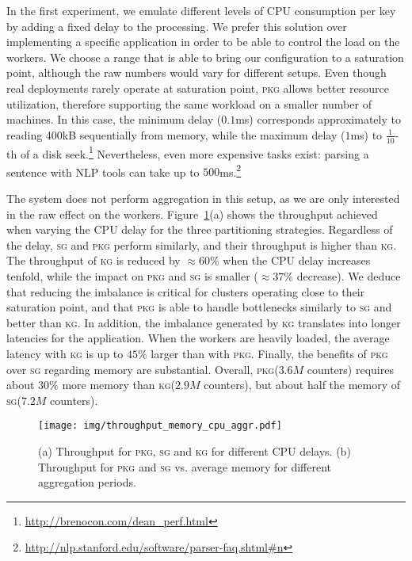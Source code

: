 \documentclass[10pt,conference,letterpaper]{IEEEtran}
\newcommand{\pkgs}{\textsc{pkg}\xspace}
\newcommand{\kg}{\textsc{kg}\xspace}
\newcommand{\sg}{\textsc{sg}\xspace}
\begin{document}
In the first experiment, we emulate different levels of CPU consumption per key by adding a fixed delay to the processing.
We prefer this solution over implementing a specific application in order to be able to control the load on the workers.
We choose a range that is able to bring our configuration to a saturation point, although the raw numbers would vary for different setups.
Even though real deployments rarely operate at saturation point, \pkgs allows better resource utilization, therefore supporting the same workload on a smaller number of machines.
In this case, the minimum delay ($0.1$ms) corresponds approximately to reading 400kB sequentially from memory, while the maximum delay ($1$ms) to $\frac{1}{10}$-th of a disk seek.\footnote{\url{http://brenocon.com/dean_perf.html}}
Nevertheless, even more expensive tasks exist: parsing a sentence with NLP tools can take up to $500$ms.\footnote{\url{http://nlp.stanford.edu/software/parser-faq.shtml\#n}}

The system does not perform aggregation in this setup, as we are only interested in the raw effect on the workers.
Figure~\ref{fig:throughput_memory_cpu_aggr}(a) shows the throughput achieved when varying the CPU delay for the three partitioning strategies.
Regardless of the delay, \sg and \pkgs perform similarly, and their throughput is higher than \kg.
The throughput of \kg is reduced by $\approx 60\%$ when the CPU delay increases tenfold, while the impact on \pkgs and \sg is smaller ($\approx 37\%$ decrease).
We deduce that reducing the imbalance is critical for clusters operating close to their saturation point, and that \pkgs is able to handle bottlenecks similarly to \sg and better than \kg.
In addition, the imbalance generated by \kg translates into longer latencies for the application.
When the workers are heavily loaded, the average latency with \kg is up to $45\%$ larger than with \pkgs. Finally, the benefits of \pkgs over \sg regarding memory are substantial.
Overall, \pkgs ($3.6M$ counters) requires about $30\%$ more memory than \kg ($2.9M$ counters), but about half the memory of \sg ($7.2M$ counters).

\begin{figure}[t]
\begin{center}
	\texttt{[image: img/throughput\_memory\_cpu\_aggr.pdf]}
	\caption{(a) Throughput for \pkgs, \sg and \kg for different CPU delays. (b) Throughput for \pkgs and \sg vs. average memory for different aggregation periods.}
	\label{fig:throughput_memory_cpu_aggr}
\end{center}
\end{figure}
\end{document}
